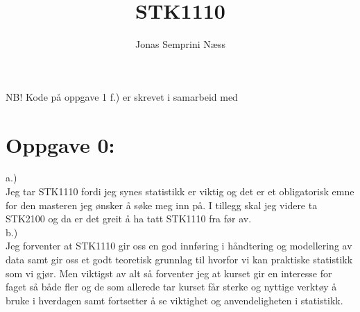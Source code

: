 \documentclass[12pt,
               a4paper,
               article,
               oneside,
               oldfontcommands,
               norsk]{memoir}
\title{STK1110}
\author{Jonas Semprini Næss}
\begin{document}
\maketitle
NB! Kode på oppgave 1 f.) er skrevet i samarbeid med 
\section*{Oppgave 0:}
a.) \\ 
Jeg tar STK1110 fordi jeg synes statistikk er viktig og det er et obligatorisk emne for den masteren jeg ønsker å søke meg inn på. I tillegg skal jeg videre ta STK2100 og da er det greit å ha tatt STK1110 fra før av.\\ 
b.) \\ 
Jeg forventer at STK1110 gir oss en god innføring i håndtering og modellering av data samt gir oss et godt teoretisk grunnlag til hvorfor vi kan praktiske statistikk som vi gjør. Men viktigst av alt så forventer jeg at kurset gir en interesse for faget så både fler og de som allerede tar kurset får sterke og nyttige verktøy å bruke i hverdagen samt fortsetter å se viktighet og anvendeligheten i statistikk.
\end{document}
